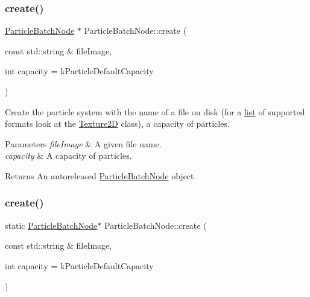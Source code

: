 \subsubsection{\texorpdfstring{create()}{create()}\hspace{0.1cm}{\footnotesize\ttfamily [1/2]}}
{\footnotesize\ttfamily \hyperlink{classParticleBatchNode}{Particle\+Batch\+Node} $\ast$ Particle\+Batch\+Node\+::create (\begin{DoxyParamCaption}\item[{const std\+::string \&}]{file\+Image,  }\item[{int}]{capacity = {\ttfamily kParticleDefaultCapacity} }\end{DoxyParamCaption})\hspace{0.3cm}{\ttfamily [static]}}

Create the particle system with the name of a file on disk (for a \hyperlink{protocollist-p}{list} of supported formats look at the \hyperlink{classTexture2D}{Texture2D} class), a capacity of particles.


\begin{DoxyParams}{Parameters}
{\em file\+Image} & A given file name. \\
\hline
{\em capacity} & A capacity of particles. \\
\hline
\end{DoxyParams}
\begin{DoxyReturn}{Returns}
An autoreleased \hyperlink{classParticleBatchNode}{Particle\+Batch\+Node} object. 
\end{DoxyReturn}
\mbox{\label{classParticleBatchNode_aa4b9d7434e4f774c9ee1c4e2eb77043a}} 
\subsubsection{\texorpdfstring{create()}{create()}\hspace{0.1cm}{\footnotesize\ttfamily [2/2]}}
{\footnotesize\ttfamily static \hyperlink{classParticleBatchNode}{Particle\+Batch\+Node}$\ast$ Particle\+Batch\+Node\+::create (\begin{DoxyParamCaption}\item[{const std\+::string \&}]{file\+Image,  }\item[{int}]{capacity = {\ttfamily kParticleDefaultCapacity} }\end{DoxyParamCaption})\hspace{0.3cm}{\ttfamily [static]}}

